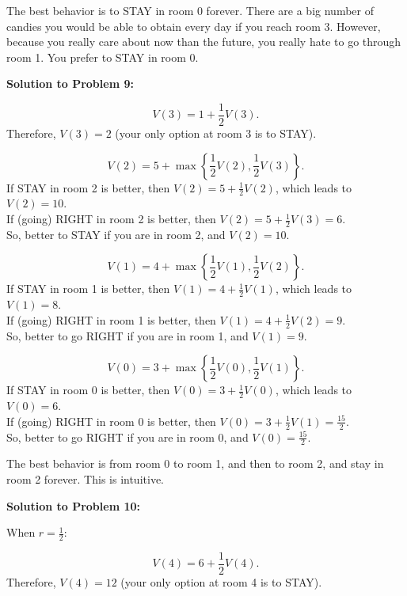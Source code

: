 \documentclass[a4paper, 12pt]{article}
\begin{document}
The best behavior is to STAY in room 0 forever. There are a big number of candies you would be able to obtain every day if you reach room 3. However, because you really care about now than the future, you really hate to go through room 1. You prefer to STAY in room 0.

\textbf{Solution to Problem 9:}

\begin{equation*}
V(3) = 1 + \frac{1}{2} V(3).
\end{equation*}
Therefore, $V(3) = 2$ (your only option at room 3 is to STAY).

\begin{equation*}
V(2) = 5 + \max \left\{ \frac{1}{2} V(2), \frac{1}{2} V(3) \right\}.
\end{equation*}
If STAY in room 2 is better, then $V(2) = 5 + \frac{1}{2} V(2)$, which leads to $V(2) = 10$.\\
If (going) RIGHT in room 2 is better, then $V(2) = 5 + \frac{1}{2} V(3) = 6$.\\
So, better to STAY if you are in room 2, and $V(2) = 10$.

\begin{equation*}
V(1) = 4 + \max \left\{ \frac{1}{2} V(1), \frac{1}{2} V(2) \right\}.
\end{equation*}
If STAY in room 1 is better, then $V(1) = 4 + \frac{1}{2} V(1)$, which leads to $V(1) = 8$.\\
If (going) RIGHT in room 1 is better, then $V(1) = 4 + \frac{1}{2} V(2) = 9$.\\
So, better to go RIGHT if you are in room 1, and $V(1) = 9$.

\begin{equation*}
V(0) = 3 + \max \left\{ \frac{1}{2} V(0), \frac{1}{2} V(1) \right\}.
\end{equation*}
If STAY in room 0 is better, then $V(0) = 3 + \frac{1}{2} V(0)$, which leads to $V(0) = 6$.\\
If (going) RIGHT in room 0 is better, then $V(0) = 3 + \frac{1}{2} V(1) = \frac{15}{2}$.\\
So, better to go RIGHT if you are in room 0, and $V(0) = \frac{15}{2}$.

The best behavior is from room 0 to room 1, and then to room 2, and stay in room 2 forever. This is intuitive.

\textbf{Solution to Problem 10:}

When $r = \frac{1}{2}$:

\begin{equation*}
V(4) = 6 + \frac{1}{2} V(4).
\end{equation*}
Therefore, $V(4) = 12$ (your only option at room 4 is to STAY).
\end{document}
